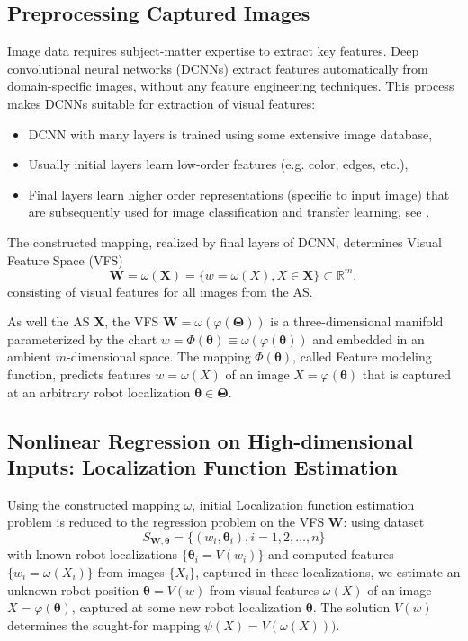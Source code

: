 \documentclass[conference]{IEEEtran} %
\def\mbW{\mathbf{W}}
\def\mbTheta{{\bm\Theta}}
\def\mbtheta{{\bm\theta}}
\def\mbX{\mathbf{X}}
\def\RR{\mathbb{R}}
\begin{document}
\subsection{Preprocessing Captured Images}
\label{sec3.1}
Image data requires subject-matter expertise to extract key features. Deep convolutional neural networks (DCNNs) extract features automatically from domain-specific images, without any feature engineering techniques. This process makes DCNNs suitable for extraction of visual features:
\begin{itemize}
\item DCNN with many layers is trained using some extensive image database,
\item Usually initial layers learn low-order features (e.g. color, edges, etc.),
\item Final layers learn higher order representations (specific to input image) that are subsequently used for image classification and transfer learning, see \cite{trans2}.
\end{itemize}

The constructed mapping, realized by final layers of DCNN, determines Visual Feature Space (VFS)
\begin{equation}
  \label{eq4}
  \mbW = \omega(\mbX) = \{w =\omega(X), X \in \mbX\} \subset \RR^m,
\end{equation}
consisting of visual features for all images from the AS.

As well the AS $\mbX$, the VFS $\mbW = \omega(\varphi(\mbTheta))$ is a three-dimensional manifold parameterized by the chart $w = \Phi(\mbtheta)  \equiv \omega(\varphi(\mbtheta))$ and embedded in an ambient $m$-dimensional space. The mapping $\Phi(\mbtheta)$, called Feature modeling function, predicts features $w = \omega(X)$ of an image $X = \varphi(\mbtheta)$ that is captured at an arbitrary robot localization $\mbtheta \in \mbTheta$.

\subsection{Nonlinear Regression on High-dimensional Inputs: Localization Function Estimation}
\label{sec3.2}

Using the constructed mapping $\omega$, initial Localization function estimation problem is reduced to the regression problem on the VFS $\mbW$: using dataset
\begin{equation}
  \label{eq5}
  S_{\mathbf{W},\mbtheta} = \{(w_i, \mbtheta_i), i=1,2, \dots, n\}
\end{equation}
with known robot localizations $\{\mbtheta_i = V(w_i)\}$ and computed features $\{w_i = \omega(X_i)\}$ from  images $\{X_i\}$, captured in these localizations, we estimate an unknown robot position $\mbtheta = V(w)$ from visual features $\omega(X)$ of an image $X = \varphi(\mbtheta)$, captured at some new robot localization $\mbtheta$. The solution $V(w)$ determines the sought-for mapping $\psi(X) = V(\omega(X)))$.
\end{document}
